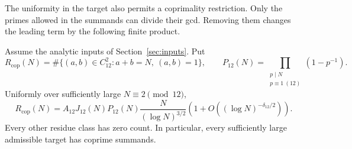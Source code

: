 The uniformity in the target also permits a coprimality restriction.
Only the primes allowed in the summands can divide their gcd.
Removing them changes the leading term by the following finite product.
\begin{corollary}\label{cor:coprime-c12}
Assume the analytic inputs of Section~\ref{sec:inputs}.
Put
\[
 R_{\mathrm{cop}}(N)=\#\{(a,b)\in C_{12}^2:a+b=N,\ (a,b)=1\},
 \qquad
 P_{12}(N)=\prod_{\substack{p\mid N\\p\equiv1\ (12)}}(1-p^{-1}).
\]
Uniformly over sufficiently large \(N\equiv2\pmod{12}\),
\[
 R_{\mathrm{cop}}(N)
 =A_{12}J_{12}(N)P_{12}(N)\frac{N}{(\log N)^{3/2}}
       \left(1+O((\log N)^{-\delta_{12}/2})\right).
\]
Every other residue class has zero count. In particular, every
sufficiently large admissible target has coprime summands.
\end{corollary}
